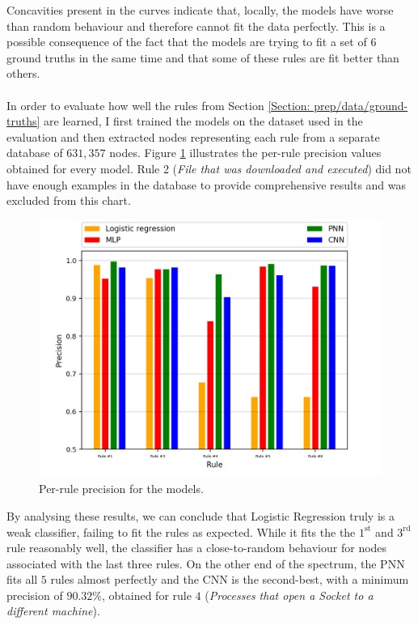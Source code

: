 		Concavities present in the curves indicate that, locally, the models have worse than random behaviour and therefore cannot fit the data perfectly. This is a possible consequence of the fact that the models are trying to fit a set of $6$ ground truths in the same time and that some of these rules are fit better than others. 
		\\ \\
		In order to evaluate how well the rules from Section \ref{Section: prep/data/ground-truths} are learned, I first trained the models on the dataset used in the evaluation and then extracted nodes representing each rule from a separate database of $631, 357$ nodes. Figure \ref{Figure: eval/ml/results/per-rule} illustrates the per-rule precision values obtained for every model. Rule 2 (\textit{File that was downloaded and executed}) did not have enough examples in the database to provide comprehensive results and was excluded from this chart. 
		\begin{figure}[H]
			\centering
			\includegraphics[width=.8\textwidth]{graphics/per-rule-precision}
			\caption{Per-rule precision for the models.}
			\label{Figure: eval/ml/results/per-rule}
		\end{figure}
		By analysing these results, we can conclude that Logistic Regression truly is a weak classifier, failing to fit the rules as expected. While it fits the the $1^{\text{st}}$ and $3^{\text{rd}}$ rule reasonably well, the classifier has a close-to-random behaviour for nodes associated with the last three rules. On the other end of the spectrum, the PNN fits all $5$ rules almost perfectly and the CNN is the second-best, with a minimum precision of $90.32 \%$, obtained for rule $4$ (\textit{Processes that open a Socket to a different machine}).  
		\\ \\
